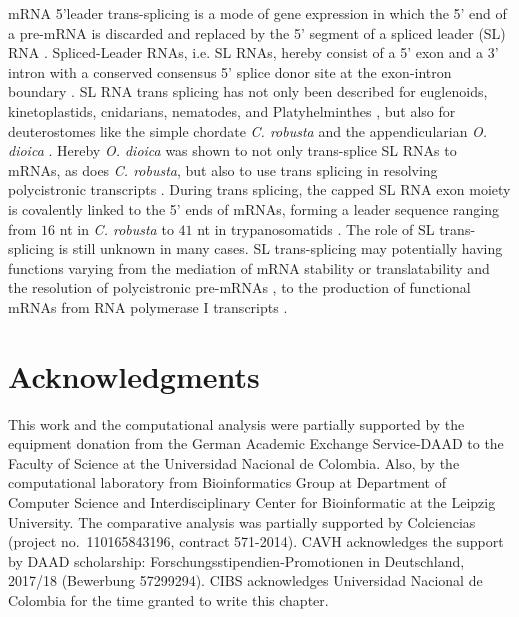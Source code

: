 \documentclass[graybox]{svmult}
\begin{document}
mRNA 5'leader trans-splicing is a mode of gene expression in which the 5' end 
of a pre-mRNA is discarded and replaced by the 5' segment of a spliced leader 
(SL) RNA \cite{Vandenberghe2001}. Spliced-Leader RNAs, i.e. SL RNAs, hereby 
consist of a 5' exon and a 3' intron with a conserved consensus 5' splice donor 
site at the exon-intron boundary \cite{Ganot2004}. SL RNA trans splicing has 
not only been described for euglenoids, kinetoplastids, cnidarians, nematodes, 
and Platyhelminthes \cite{Ganot2004}, but also for deuterostomes like the 
simple 
chordate \textit{C. robusta} \cite{Vandenberghe2001} and the 
appendicularian \textit{O. dioica} \cite{Ganot2004}. Hereby \textit{O. dioica} 
was shown to not only trans-splice SL RNAs to mRNAs, as does \textit{C. 
robusta}, but also to use trans splicing in resolving polycistronic 
transcripts \cite{Ganot2004}. During trans splicing, the capped SL RNA exon 
moiety is covalently linked to the 5' ends of mRNAs, forming a leader sequence 
ranging from $16$ nt in \textit{C. robusta} to $41$ nt in trypanosomatids 
\cite{Ganot2004}. The role of SL trans-splicing is still unknown in many cases. 
SL trans-splicing may potentially having functions varying from the mediation 
of mRNA stability or translatability \cite{Maroney1995} and the resolution 
of polycistronic pre-mRNAs \cite{Agabian1990, Blumenthal1995}, to the 
production of functional mRNAs from RNA polymerase I 
transcripts \cite{ShuLee1997}.

\section{Acknowledgments}
This work and the computational analysis were partially supported by the 
equipment donation from the German Academic Exchange Service-DAAD to the 
Faculty of Science at the Universidad Nacional de Colombia. Also, by the 
computational laboratory from Bioinformatics Group at Department of Computer 
Science and Interdisciplinary Center for Bioinformatic at the Leipzig 
University. The comparative analysis was partially supported by Colciencias 
(project no.\ 110165843196, contract 571-2014). CAVH acknowledges the support by 
DAAD scholarship: Forschungsstipendien-Promotionen in Deutschland, 2017/18 
(Bewerbung 57299294). CIBS acknowledges Universidad Nacional de Colombia for the 
time granted to write this chapter.



%
\end{document}
